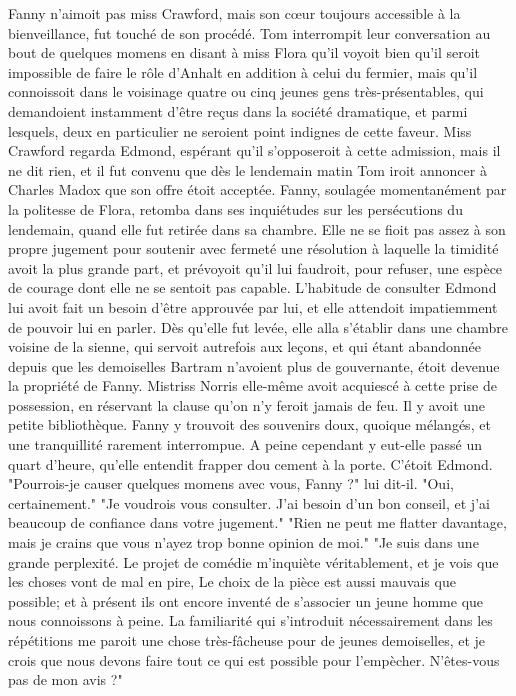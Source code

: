 Fanny n'aimoit pas miss Crawford, mais son cœur toujours accessible à la bienveillance, fut touché de son procédé. Tom interrompit leur conversation au bout de quelques momens en disant à miss Flora qu'il voyoit bien qu'il seroit impossible de faire le rôle d'Anhalt en addition à celui du fermier, mais qu'il connoissoit dans le voisinage quatre ou cinq jeunes gens très-présentables, qui demandoient instamment d'être reçus dans la société dramatique, et parmi lesquels, deux en particulier ne seroient point indignes de cette faveur. Miss Crawford regarda Edmond, espérant qu'il s'opposeroit à cette admission, mais il ne dit rien, et il fut convenu que dès le lendemain matin Tom iroit annoncer à Charles Madox que son offre étoit acceptée.\setcounter{page}{119} Fanny, soulagée momentanément par la politesse de Flora, retomba dans ses inquiétudes sur les persécutions du lendemain, quand elle fut retirée dans sa chambre. Elle ne se fioit pas assez à son propre jugement pour soutenir avec fermeté une résolution à laquelle la timidité avoit la plus grande part, et prévoyoit qu'il lui faudroit, pour refuser, une espèce de courage dont elle ne se sentoit pas capable. L'habitude de consulter Edmond lui avoit fait un besoin d'être approuvée par lui, et elle attendoit impatiemment de pouvoir lui en parler. Dès qu'elle fut levée, elle alla s'établir dans une chambre voisine de la sienne, qui servoit autrefois aux leçons, et qui étant abandonnée depuis que les demoiselles Bartram n'avoient plus de gouvernante, étoit devenue la propriété de Fanny. Mistriss Norris elle-même avoit acquiescé à cette prise de possession, en réservant la clause qu'on n'y feroit jamais de feu. Il y avoit une petite bibliothèque. Fanny y trouvoit des souvenirs doux, quoique mélangés, et une tranquillité rarement interrompue.
A peine cependant y eut-elle passé un quart d'heure, qu'elle entendit frapper dou\setcounter{page}{120} cement à la porte. C'étoit Edmond.
"Pourrois-je causer quelques momens avec vous, Fanny ?" lui dit-il.
"Oui, certainement."
"Je voudrois vous consulter. J'ai besoin d'un bon conseil, et j'ai beaucoup de confiance dans votre jugement."
"Rien ne peut me flatter davantage, mais je crains que vous n'ayez trop bonne opinion de moi."
"Je suis dans une grande perplexité. Le projet de comédie m'inquiète véritablement, et je vois que les choses vont de mal en pire, Le choix de la pièce est aussi mauvais que possible; et à présent ils ont encore inventé de s'associer un jeune homme que nous connoissons à peine. La familiarité qui s'introduit nécessairement dans les répétitions me paroit une chose très-fâcheuse pour de jeunes demoiselles, et je crois que nous devons faire tout ce qui est possible pour l'empècher. N'êtes-vous pas de mon avis ?"
